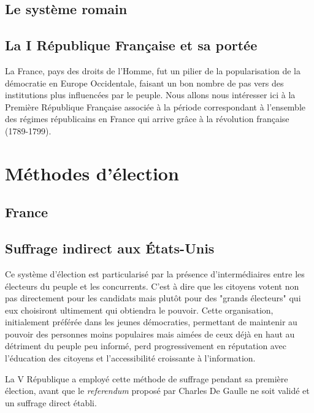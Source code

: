 \documentclass[12pt,a4paper]{report}
\begin{document}
\section{Le système romain}

\section{La I République Française et sa portée}
La France, pays des droits de l'Homme, fut un pilier de la popularisation de la démocratie en Europe Occidentale, faisant un bon nombre de pas vers des institutions plus influencées par le peuple.
Nous allons nous intéresser ici à la Première République Française associée à la période correspondant à l'ensemble des régimes républicains en France qui arrive grâce à la révolution française (1789-1799). \nocite{wiki:premiererep}


\chapter{Méthodes d'élection}
\section{France} %

\section{Suffrage indirect aux États-Unis}

Ce système d'élection est particularisé par la présence d'intermédiaires entre les électeurs du peuple et les concurrents. 
C'est à dire que les citoyens votent non pas directement pour les candidats mais plutôt pour des "grands électeurs" qui eux choisiront ultimement qui obtiendra le pouvoir.
Cette organisation, initialement préférée dans les jeunes démocraties, permettant de maintenir au pouvoir des personnes moins populaires mais aimées de ceux déjà en haut au détriment du peuple peu informé, perd progressivement en réputation avec l'éducation des citoyens et l'accessibilité croissante à l'information.
\nocite{wiki:scrutinindir}

La V République a employé cette méthode de suffrage pendant sa première élection, avant que le \textit{referendum} proposé par Charles De Gaulle ne soit validé et un suffrage direct établi. \nocite{polmania:scrutins}
\end{document}
